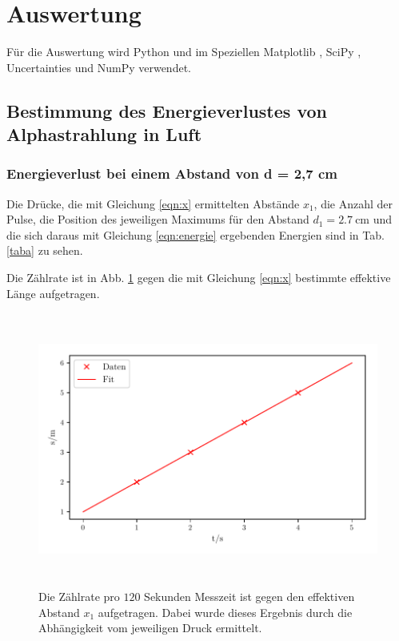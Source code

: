 \section{Auswertung}
\label{sec:Auswertung}

Für die Auswertung wird Python und im Speziellen Matplotlib \cite{matplotlib}, SciPy \cite{scipy}, Uncertainties \cite{uncertainties} und NumPy \cite{numpy} verwendet.

\subsection{Bestimmung des Energieverlustes von Alphastrahlung in Luft}

\subsubsection{Energieverlust bei einem Abstand von d = 2,7 cm} %
Die Drücke, die mit Gleichung \eqref{eqn:x} ermittelten Abstände $x_1$, die Anzahl der Pulse, die Position des jeweiligen Maximums für den Abstand $d_1 = \SI{2.7}{\centi\meter}$ und die sich daraus mit Gleichung \eqref{eqn:energie} ergebenden Energien sind in Tab. \ref{taba} zu sehen.
 


\noindent Die Zählrate ist in Abb. \ref{zaehlrate1} gegen die mit Gleichung \eqref{eqn:x} bestimmte effektive Länge aufgetragen.

\begin{figure}
    \centering
    \includegraphics[width=15cm, height=9cm]{build/plota.pdf}
    \caption{Die Zählrate pro $\num{120}$ Sekunden Messzeit ist gegen den effektiven Abstand $x_1$ aufgetragen. Dabei wurde dieses Ergebnis durch die Abhängigkeit vom jeweiligen Druck ermittelt.}
    \label{zaehlrate1}
\end{figure}

